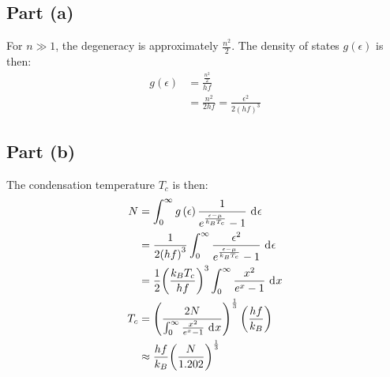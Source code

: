\documentclass{article}
\begin{document}
\clearpage

\problem
\subsection*{Part (a)}
For $n \gg 1$, the degeneracy is approximately $\frac{n^2}{2}$. The density of states $g\left(\epsilon\right)$ is then:
\begin{equation}
    \begin{split}
        g\left(\epsilon\right) & = \frac{\frac{n^2}{2}}{hf} \\
        & = \frac{n^2}{2hf} = \frac{\epsilon^2}{2{\left(hf\right)}^3}
    \end{split}
\end{equation}
\subsection*{Part (b)}
The condensation temperature $T_c$ is then:
\begin{equation}
    \begin{split}
        N & = \int_0^{\infty} g\left(\epsilon\right)\frac{1}{e^{\frac{\epsilon - \mu}{k_BT_c}} - 1} \, \diff{\epsilon} \\
        & = \frac{1}{2{\left(hf\right)}^3}\int_0^{\infty} \frac{\epsilon^2}{e^{\frac{\epsilon - \mu}{k_BT_c}} - 1} \, \diff{\epsilon} \\
        & = \frac{1}{2}{\left(\frac{k_BT_c}{hf}\right)}^3\int_0^{\infty} \frac{x^2}{e^x - 1} \, \diff{x} \\
        T_c & = {\left(\frac{2N}{\int_0^{\infty}\frac{x^2}{e^x - 1} \, \diff{x}}\right)}^{\frac{1}{3}}\left(\frac{hf}{k_B}\right) \\
        & \approx \frac{hf}{k_B}{\left(\frac{N}{1.202}\right)}^{\frac{1}{3}}
    \end{split}
\end{equation}
\end{document}
